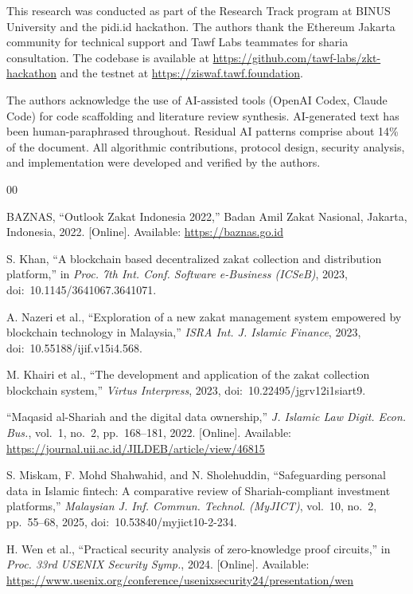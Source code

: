 \documentclass[conference]{IEEEtran}
\begin{document}
This research was conducted as part of the Research Track program at BINUS University and the pidi.id hackathon. The authors thank the Ethereum Jakarta community for technical support and Tawf Labs teammates for sharia consultation. The codebase is available at \url{https://github.com/tawf-labs/zkt-hackathon} and the testnet at \url{https://ziswaf.tawf.foundation}.

The authors acknowledge the use of AI-assisted tools (OpenAI Codex, Claude Code) for code scaffolding and literature review synthesis. AI-generated text has been human-paraphrased throughout. Residual AI patterns comprise about 14\% of the document. All algorithmic contributions, protocol design, security analysis, and implementation were developed and verified by the authors.

\begin{thebibliography}{00}

BAZNAS, ``Outlook Zakat Indonesia 2022,'' Badan Amil Zakat Nasional, Jakarta, Indonesia, 2022. [Online]. Available: \url{https://baznas.go.id}

S. Khan, ``A blockchain based decentralized zakat collection and distribution platform,'' in \textit{Proc. 7th Int. Conf. Software e-Business (ICSeB)}, 2023, doi:~10.1145/3641067.3641071.

A. Nazeri et al., ``Exploration of a new zakat management system empowered by blockchain technology in Malaysia,'' \textit{ISRA Int. J. Islamic Finance}, 2023, doi:~10.55188/ijif.v15i4.568.

M. Khairi et al., ``The development and application of the zakat collection blockchain system,'' \textit{Virtus Interpress}, 2023, doi:~10.22495/jgrv12i1siart9.

``Maqasid al-Shariah and the digital data ownership,'' \textit{J. Islamic Law Digit. Econ. Bus.}, vol.~1, no.~2, pp.~168--181, 2022. [Online]. Available: \url{https://journal.uii.ac.id/JILDEB/article/view/46815}

S. Miskam, F. Mohd Shahwahid, and N. Sholehuddin, ``Safeguarding personal data in Islamic fintech: A comparative review of Shariah-compliant investment platforms,'' \textit{Malaysian J. Inf. Commun. Technol. (MyJICT)}, vol.~10, no.~2, pp.~55--68, 2025, doi:~10.53840/myjict10-2-234.

H. Wen et al., ``Practical security analysis of zero-knowledge proof circuits,'' in \textit{Proc. 33rd USENIX Security Symp.}, 2024. [Online]. Available: \url{https://www.usenix.org/conference/usenixsecurity24/presentation/wen}


\end{thebibliography}
\end{document}
